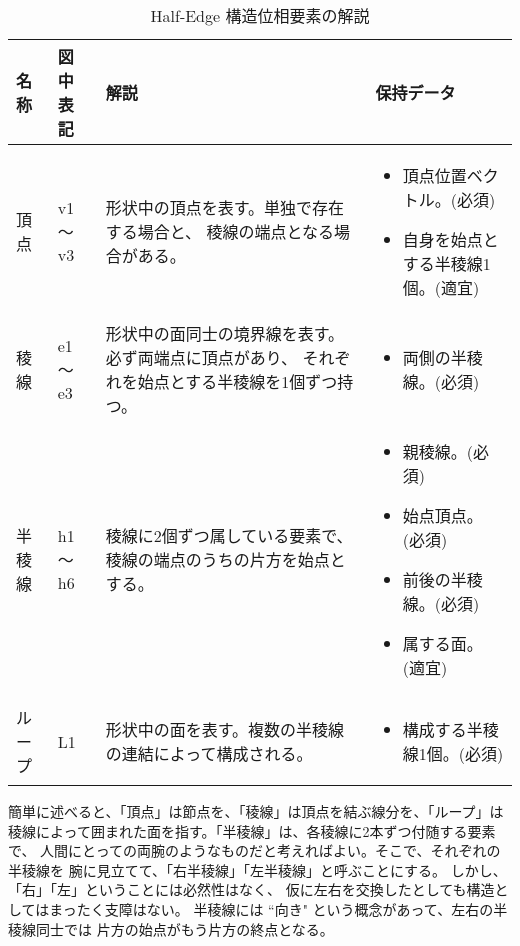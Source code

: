 \begin{table}[H]
\caption{Half-Edge 構造位相要素の解説}
\label{tbl:HalfEdge1}
\begin{center}
\begin{tabular}{|l|l|p{6cm}|p{6cm}|}
\hline
名称 & 図中表記 & 解説 & 保持データ \\ \hline \hline
頂点 & v1 〜 v3 &
	形状中の頂点を表す。単独で存在する場合と、
	稜線の端点となる場合がある。&
	\vspace*{0mm}
	\begin{itemize}
	 \item 頂点位置ベクトル。(必須)
	 \item 自身を始点とする半稜線1個。(適宜)
	\end{itemize} \\ \hline
稜線 & e1 〜 e3 &
	形状中の面同士の境界線を表す。必ず両端点に頂点があり、
	それぞれを始点とする半稜線を1個ずつ持つ。&
	\vspace*{0mm}
	\begin{itemize}
	 \item 両側の半稜線。(必須)
	\end{itemize} \\ \hline
半稜線 & h1 〜 h6 &
	稜線に2個ずつ属している要素で、稜線の端点のうちの片方を始点とする。&
	\vspace*{0mm}
	\begin{itemize}
	 \item 親稜線。(必須)
	 \item 始点頂点。(必須)
	 \item 前後の半稜線。(必須)
	 \item 属する面。(適宜)
	\end{itemize} \\ \hline
ループ & L1 &
	形状中の面を表す。複数の半稜線の連結によって構成される。&
	\vspace*{0mm}
	\begin{itemize}
	 \item 構成する半稜線1個。(必須)
	\end{itemize} \\ \hline
\end{tabular}
\end{center}
\end{table}
簡単に述べると、「頂点」は節点を、「稜線」は頂点を結ぶ線分を、「ループ」は
稜線によって囲まれた面を指す。「半稜線」は、各稜線に2本ずつ付随する要素で、
人間にとっての両腕のようなものだと考えればよい。そこで、それぞれの半稜線を
腕に見立てて、「右半稜線」「左半稜線」と呼ぶことにする。
しかし、「右」「左」ということには必然性はなく、
仮に左右を交換したとしても構造としてはまったく支障はない。
半稜線には ``向き" という概念があって、左右の半稜線同士では
片方の始点がもう片方の終点となる。

